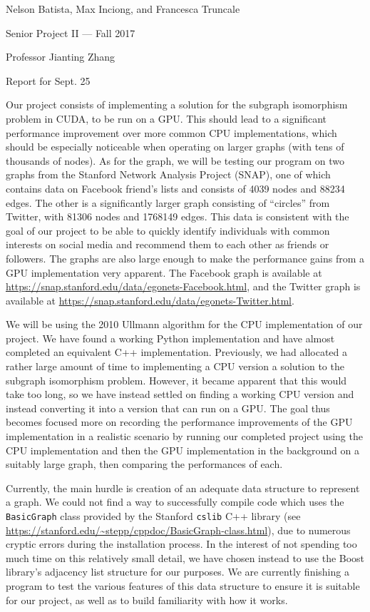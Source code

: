 \documentclass{article}
\begin{document}
\noindent Nelson Batista, Max Inciong, and Francesca Truncale

\noindent Senior Project II --- Fall 2017

\noindent Professor Jianting Zhang

\noindent Report for Sept. 25

Our project consists of implementing a solution for the subgraph isomorphism problem in CUDA, to be run on a GPU\@. This should lead to a significant performance improvement over more common CPU implementations, which should be especially noticeable when operating on larger graphs (with tens of thousands of nodes). As for the graph, we will be testing our program on two graphs from the Stanford Network Analysis Project (SNAP), one of which contains data on Facebook friend's lists and consists of 4039 nodes and 88234 edges. The other is a significantly larger graph consisting of ``circles'' from Twitter, with 81306 nodes and 1768149 edges. This data is consistent with the goal of our project to be able to quickly identify individuals with common interests on social media and recommend them to each other as friends or followers. The graphs are also large enough to make the performance gains from a GPU implementation very apparent. The Facebook graph is available at \url{https://snap.stanford.edu/data/egonets-Facebook.html}, and the Twitter graph is available at \url{https://snap.stanford.edu/data/egonets-Twitter.html}.

We will be using the 2010 Ullmann algorithm for the CPU implementation of our project. We have found a working Python implementation and have almost completed an equivalent C++ implementation. Previously, we had allocated a rather large amount of time to implementing a CPU version a solution to the subgraph isomorphism problem. However, it became apparent that this would take too long, so we have instead settled on finding a working CPU version and instead converting it into a version that can run on a GPU\@. The goal thus becomes focused more on recording the performance improvements of the GPU implementation in a realistic scenario by running our completed project using the CPU implementation and then the GPU implementation in the background on a suitably large graph, then comparing the performances of each.

Currently, the main hurdle is creation of an adequate data structure to represent a graph. We could not find a way to successfully compile code which uses the \texttt{BasicGraph} class provided by the Stanford \texttt{cslib} C++ library (see \url{https://stanford.edu/~stepp/cppdoc/BasicGraph-class.html}), due to numerous cryptic errors during the installation process. In the interest of not spending too much time on this relatively small detail, we have chosen instead to use the Boost library's adjacency list structure for our purposes. We are currently finishing a program to test the various features of this data structure to ensure it is suitable for our project, as well as to build familiarity with how it works.
\end{document}
